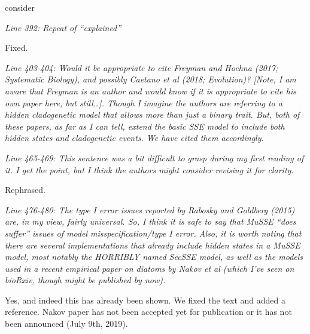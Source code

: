 \documentclass[11pt]{article}
\renewenvironment{quote}{\bigskip\noindent\itshape\ignorespaces}{\smallskip}
\begin{document}
consider %


\begin{quote}
Line 392: Repeat of ``explained''
\end{quote}

Fixed.

\begin{quote}
Line 403-404: Would it be appropriate to cite Freyman and Hoehna (2017; Systematic Biology), and possibly Caetano et al (2018; Evolution)?
[Note, I am aware that Freyman is an author and would know if it is appropriate to cite his own paper here, but still\ldots]. 
Though I imagine the authors are referring to a hidden cladogenetic model that allows more than just a binary trait.
But, both of these papers, as far as I can tell, extend the basic SSE model to include both hidden states and cladogenetic events.
\end{quote}
We have cited them accordingly. %


\begin{quote}
Line 465-469: This sentence was a bit difficult to grasp during my first reading of it.
I get the point, but I think the authors might consider revising it for clarity.
\end{quote}

Rephrased. %

\begin{quote}
Line 476-480: The type I error issues reported by Rabosky and Goldberg (2015) are, in my view, fairly universal.
So, I think it is safe to say that MuSSE ``does suffer'' issues of model misspecification/type I error.
Also, it is worth noting that there are several implementations that already include hidden states in a MuSSE model, most notably the HORRIBLY named SecSSE model, as well as the models used in a recent empirical paper on diatoms by Nakov et al (which I've seen on bioRxiv, though might be published by now).
\end{quote}

Yes, and indeed this has already been shown.
We fixed the text and added a reference. Nakov paper has not been accepted yet for publication or it has not been announced (July 9th, 2019).



\end{document}

